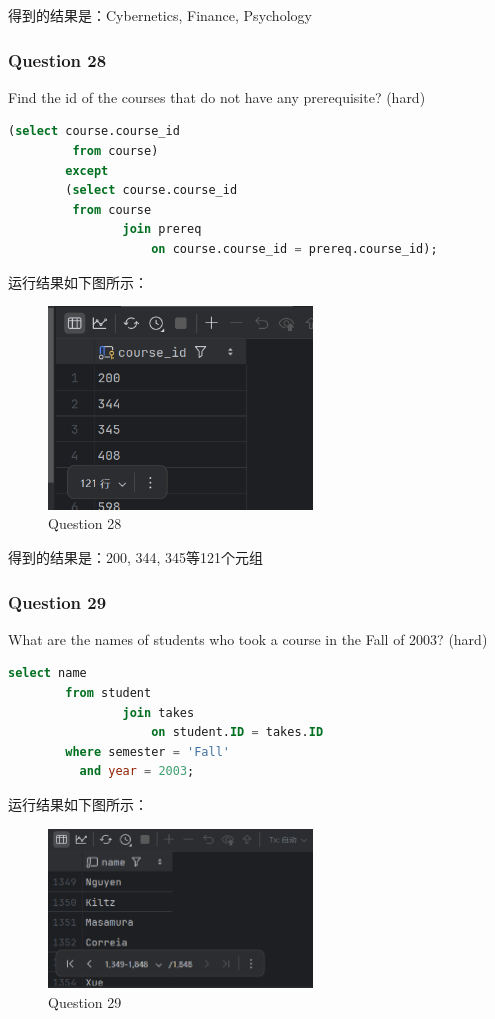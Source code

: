 \documentclass{article}
\begin{document}
    得到的结果是：Cybernetics, Finance, Psychology
    
    \subsubsection{Question 28}
    
    Find the id of the courses that do not have any prerequisite? (hard)
    
    \begin{lstlisting}[language=sql, title=Question 28, tabsize=4]
    	(select course.course_id
    	 from course)
    	except
    	(select course.course_id
    	 from course
    			join prereq
    				on course.course_id = prereq.course_id);
    \end{lstlisting}
    
    运行结果如下图所示：
    
    \begin{figure}[H]
    	\centering
    	\includegraphics[width=7cm]{./images/32.Question28.png}
    	\caption{Question 28}
    \end{figure}
    
    得到的结果是：200, 344, 345等121个元组
    
    \subsubsection{Question 29}
    
    What are the names of students who took a course in the Fall of 2003?  (hard)
    
    \begin{lstlisting}[language=sql, title=Question 29, tabsize=4]
    	select name
    	from student
    			join takes
    				on student.ID = takes.ID
    	where semester = 'Fall'
    	  and year = 2003;
    \end{lstlisting}
    
    运行结果如下图所示：
    
    \begin{figure}[H]
    	\centering
    	\includegraphics[width=7cm]{./images/33.Question29.png}
    	\caption{Question 29}
    \end{figure}
    
\end{document}
